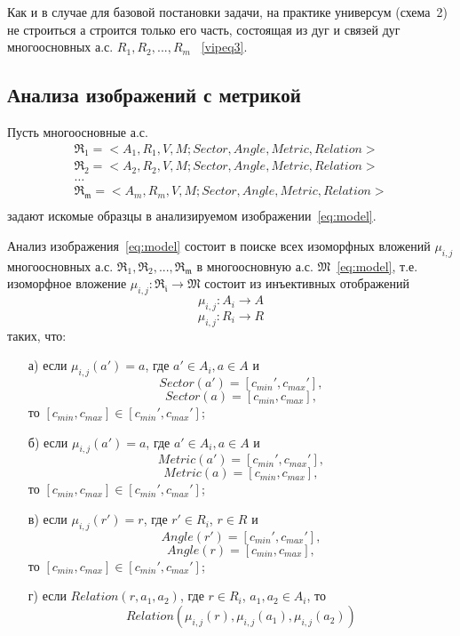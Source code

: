 \begin{remark}
Как и в случае для базовой постановки задачи, на практике универсум (схема~2) не строиться а строится только его часть, состоящая из дуг и связей дуг многоосновных а.с.  $R_1,R_2 , ..., R_m$ ~\ref{vipeq3}.
\end{remark}

\subsection{Анализа изображений с метрикой}

Пусть многоосновные а.с.
\begin{equation}
	\begin{array}{c}
	\mathfrak{R_1}=<A_1, R_1, V, M; Sector, Angle, Metric, Relation> \\
	\mathfrak{R_2}=<A_2, R_2, V, M; Sector, Angle, Metric, Relation> \\
	\dots\\
	\mathfrak{R_m}=<A_m, R_m, V, M; Sector, Angle, Metric, Relation> \\
	\end{array}
\end{equation}
задают искомые образцы в анализируемом изображении~\ref{eq:model}.

Анализ изображения~\ref{eq:model} состоит в поиске всех изоморфных вложений ${ \mu_{i,j} }$ многоосновных а.с. $\mathfrak{R_1,R_2,...,R_m}$ в многоосновную а.с. $\mathfrak{M}$~\ref{eq:model}, т.е. изоморфное вложение $\mu_{i,j} : \mathfrak{R_i} \rightarrow \mathfrak{M}$ состоит из инъективных отображений
$$\mu_{i,j} : A_i \rightarrow A$$
$$\mu_{i,j} : R_i \rightarrow R$$
таких, что:
\begin{enumerate}
\item[а)] если $\mu_{i,j}(a') = a$, где $a' \in A_i, a \in A$ и 
$$Sector(a') = [c_{min}', c_{max}'],$$
$$Sector(a) = [c_{min}, c_{max}],$$
то $[c_{min}, c_{max}] \in [c_{min}', c_{max}']$;
\item[б)] если $\mu_{i,j}(a') = a$, где $a' \in A_i, a \in A$ и 
$$Metric(a') = [c_{min}', c_{max}'],$$
$$Metric(a) = [c_{min}, c_{max}],$$
то $[c_{min}, c_{max}] \in [c_{min}', c_{max}']$;
\item[в)] если $\mu_{i,j}(r') = r$, где $r' \in R_i$, $r \in R$ и 
$$Angle(r') =  [c_{min}', c_{max}'],$$
$$Angle(r) = [c_{min}, c_{max}],$$
то $[c_{min}, c_{max}] \in [c_{min}', c_{max}']$;
\item[г)] если $Relation(r, a_1, a_2)$, где $r \in R_i$, $a_1, a_2 \in A_i$, то 
$$Relation(\mu_{i,j}(r), \mu_{i,j}(a_1), \mu_{i,j}(a_2))$$
\end{enumerate}

